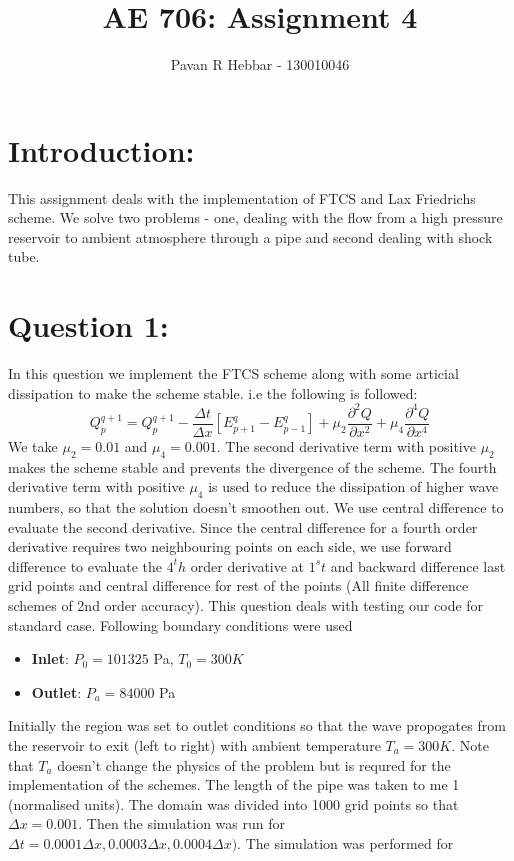 \documentclass[11pt, a4paper]{article}
\title{\textbf{AE 706: Assignment 4}}
\author{Pavan R Hebbar - 130010046}
\begin{document}
\maketitle
\newpage
\tableofcontents
\newpage
\section{Introduction:}
This assignment deals with the implementation of FTCS and Lax Friedrichs scheme. We solve two problems - one, dealing with the
flow from a high pressure reservoir to ambient atmosphere through a pipe and second dealing with shock tube.

\section{Question 1:}
In this question we implement the FTCS scheme along with some articial dissipation to make the scheme stable. i.e the following
is followed:
\begin{equation}
 Q_p^{q+1} = Q_{p}^{q+1} - \frac{\Delta t}{\Delta x}\left[E_{p+1}^{q} - E_{p-1}^q\right] + \mu_2\frac{\partial^2 Q}{\partial x^2}
 + \mu_4\frac{\partial^4 Q}{\partial x^4}
\end{equation}
We take $\mu_2 = 0.01$ and $\mu_4 = 0.001$. The second derivative term with positive $\mu_2$ makes the scheme stable and
prevents the divergence of the scheme. The fourth derivative term with positive $\mu_4$ is used to reduce the dissipation of 
higher wave numbers, so that the solution doesn't smoothen out. We use central difference to evaluate the second derivative.
Since the central difference for a fourth order derivative requires two neighbouring points on each side, we use forward 
difference to evaluate the $4^th$ order derivative at $1^st$ and backward difference last grid points and central difference for rest of the 
points (All finite difference schemes of 2nd order accuracy). This question deals with testing our code for standard case. Following boundary conditions were used
\begin{itemize}
 \item \textbf{Inlet}: $P_0 = 101325$ Pa, $T_0 = 300K$
 \item \textbf{Outlet}: $P_a = 84000$ Pa
\end{itemize}
Initially the region was set to outlet conditions so that the wave propogates from the reservoir to exit (left to right) with
ambient temperature $T_a = 300K$. Note that $T_a$ doesn't change the physics of the problem but is requred for the
implementation of the schemes.
The length of the pipe was taken to me 1 (normalised units). The domain was divided into 1000 grid points so that 
$\Delta x = 0.001$. Then the simulation was run for $\Delta t = 0.0001\Delta x, 0.0003\Delta x, 0.0004\Delta x)$.
The simulation was performed for 
\end{document}
